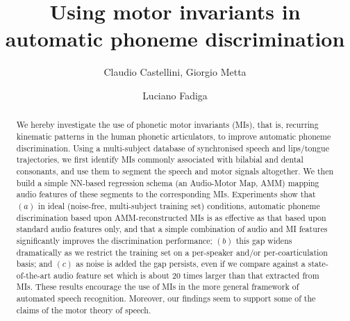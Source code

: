\documentclass{pnastwo}
\begin{document}

\title{Using motor invariants in automatic phoneme discrimination}

\author{
Claudio Castellini,
Giorgio Metta \and
Luciano Fadiga
}


\maketitle

\begin{article}

\begin{abstract}

  We hereby investigate the use of phonetic motor invariants (MIs),
  that is, recurring kinematic patterns in the human phonetic articulators,
  to improve automatic phoneme discrimination. Using a multi-subject
  database of synchronised speech and lips/tongue trajectories, we first
  identify MIs commonly associated with bilabial and dental consonants,
  and use them to segment the speech and motor signals altogether.
  We then build a simple NN-based regression schema (an Audio-Motor
  Map, AMM) mapping audio features of these segments to the corresponding
  MIs. Experiments show that $(a)$ in ideal (noise-free, multi-subject training set)
  conditions, automatic phoneme discrimination based upon AMM-reconstructed
  MIs is as effective as that based upon standard audio features
  only, and that a simple combination of audio and MI features significantly
  improves the discrimination performance; $(b)$ this gap widens dramatically
  as we restrict the training set on a per-speaker and/or per-coarticulation basis;
  and $(c)$ as noise is added the gap persists, even if we compare against
  a state-of-the-art audio feature set which is about $20$ times larger than
  that extracted from MIs. These results encourage the use of MIs in the more
  general framework of automated speech recognition. Moreover, our findings seem to
  support some of the claims of the motor theory of speech.

\end{abstract}



\end{article}
\end{document}
